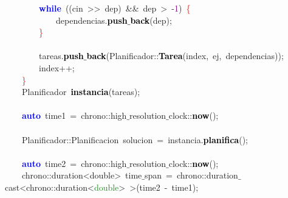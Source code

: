 \mbox{}\ \ \ \ \ \ \ \ \textbf{\textcolor{Blue}{while}}\ \textcolor{BrickRed}{((}cin\ \textcolor{BrickRed}{\textgreater{}\textgreater{}}\ dep\textcolor{BrickRed}{)}\ \textcolor{BrickRed}{\&\&}\ dep\ \textcolor{BrickRed}{\textgreater{}}\ \textcolor{BrickRed}{-}\textcolor{Purple}{1}\textcolor{BrickRed}{)}\ \textcolor{Red}{\{} \\
\mbox{}\ \ \ \ \ \ \ \ \ \ \ \ dependencias\textcolor{BrickRed}{.}\textbf{\textcolor{Black}{push$\_$back}}\textcolor{BrickRed}{(}dep\textcolor{BrickRed}{);} \\
\mbox{}\ \ \ \ \ \ \ \ \textcolor{Red}{\}} \\
\mbox{} \\
\mbox{}\ \ \ \ \ \ \ \ tareas\textcolor{BrickRed}{.}\textbf{\textcolor{Black}{push$\_$back}}\textcolor{BrickRed}{(}Planificador\textcolor{BrickRed}{::}\textbf{\textcolor{Black}{Tarea}}\textcolor{BrickRed}{(}index\textcolor{BrickRed}{,}\ ej\textcolor{BrickRed}{,}\ dependencias\textcolor{BrickRed}{));} \\
\mbox{}\ \ \ \ \ \ \ \ index\textcolor{BrickRed}{++;} \\
\mbox{}\ \ \ \ \textcolor{Red}{\}} \\
\mbox{}\ \ \ \ \textcolor{TealBlue}{Planificador}\ \textbf{\textcolor{Black}{instancia}}\textcolor{BrickRed}{(}tareas\textcolor{BrickRed}{);} \\
\mbox{} \\
\mbox{}\ \ \ \ \textbf{\textcolor{Blue}{auto}}\ time1\ \textcolor{BrickRed}{=}\ chrono\textcolor{BrickRed}{::}high$\_$resolution$\_$clock\textcolor{BrickRed}{::}\textbf{\textcolor{Black}{now}}\textcolor{BrickRed}{();} \\
\mbox{} \\
\mbox{}\ \ \ \ Planificador\textcolor{BrickRed}{::}\textcolor{TealBlue}{Planificacion}\ solucion\ \textcolor{BrickRed}{=}\ instancia\textcolor{BrickRed}{.}\textbf{\textcolor{Black}{planifica}}\textcolor{BrickRed}{();} \\
\mbox{} \\
\mbox{}\ \ \ \ \textbf{\textcolor{Blue}{auto}}\ time2\ \textcolor{BrickRed}{=}\ chrono\textcolor{BrickRed}{::}high$\_$resolution$\_$clock\textcolor{BrickRed}{::}\textbf{\textcolor{Black}{now}}\textcolor{BrickRed}{();} \\
\mbox{}\ \ \ \ chrono\textcolor{BrickRed}{::}\textcolor{TealBlue}{duration\textless{}double\textgreater{}}\ time$\_$span\ \textcolor{BrickRed}{=}\ chrono\textcolor{BrickRed}{::}duration$\_$cast\textcolor{BrickRed}{\textless{}}chrono\textcolor{BrickRed}{::}duration\textcolor{BrickRed}{\textless{}}\textcolor{ForestGreen}{double}\textcolor{BrickRed}{\textgreater{}}\ \textcolor{BrickRed}{\textgreater{}(}time2\ \textcolor{BrickRed}{-}\ time1\textcolor{BrickRed}{);} \\

